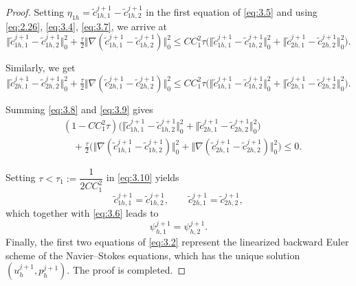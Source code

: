 \documentclass[a4paper,fleqn]{cas-sc}
\numberwithin{equation}{section}
\theoremstyle{definition}
\begin{document}
\begin{proof}
Setting $\eta_{1h}=\tilde{c}^{j+1}_{1h,1}-\tilde{c}^{j+1}_{1h,2}$ in the
first equation of \eqref{eq:3.5} and using
\eqref{eq:2.26}, \eqref{eq:3.4}, \eqref{eq:3.7}, we arrive at
\begin{equation}
  \bigl\Vert\tilde{c}^{j+1}_{1h,1}-\tilde{c}^{j+1}_{1h,2}\bigr\Vert_{0}^{2}
  + \tfrac{\tau}{2}\bigl\Vert\nabla(\tilde{c}^{j+1}_{1h,1}-\tilde{c}^{j+1}_{1h,2})\bigr\Vert_{0}^{2}
  \le CC_{1}^{2}\tau\bigl(\bigl\Vert\tilde{c}^{j+1}_{1h,1}-\tilde{c}^{j+1}_{1h,2}\bigr\Vert_{0}^{2}
      + \bigl\Vert\tilde{c}^{j+1}_{2h,1}-\tilde{c}^{j+1}_{2h,2}\bigr\Vert_{0}^{2}\bigr).
  \label{eq:3.8}
\end{equation}

Similarly, we get
\begin{equation}
  \bigl\Vert\tilde{c}^{j+1}_{2h,1}-\tilde{c}^{j+1}_{2h,2}\bigr\Vert_{0}^{2}
  + \tfrac{\tau}{2}\bigl\Vert\nabla(\tilde{c}^{j+1}_{2h,1}-\tilde{c}^{j+1}_{2h,2})\bigr\Vert_{0}^{2}
  \le CC_{1}^{2}\tau\bigl(\bigl\Vert\tilde{c}^{j+1}_{1h,1}-\tilde{c}^{j+1}_{1h,2}\bigr\Vert_{0}^{2}
      + \bigl\Vert\tilde{c}^{j+1}_{2h,1}-\tilde{c}^{j+1}_{2h,2}\bigr\Vert_{0}^{2}\bigr).
  \label{eq:3.9}
\end{equation}

Summing \eqref{eq:3.8} and \eqref{eq:3.9} gives
\begin{equation}
  \begin{aligned}
    &(1-CC_{1}^{2}\tau)
     \bigl(\bigl\Vert\tilde{c}^{j+1}_{1h,1}-\tilde{c}^{j+1}_{1h,2}\bigr\Vert_{0}^{2}
           + \bigl\Vert\tilde{c}^{j+1}_{2h,1}-\tilde{c}^{j+1}_{2h,2}\bigr\Vert_{0}^{2}\bigr)\\
    &\quad
     + \tfrac{\tau}{2}\bigl(\bigl\Vert\nabla(\tilde{c}^{j+1}_{1h,1}-\tilde{c}^{j+1}_{1h,2})\bigr\Vert_{0}^{2}
           + \bigl\Vert\nabla(\tilde{c}^{j+1}_{2h,1}-\tilde{c}^{j+1}_{2h,2})\bigr\Vert_{0}^{2}\bigr)
     \le 0.
  \end{aligned}
  \label{eq:3.10}
\end{equation}

Setting $\tau<\tau_{1}:=\dfrac{1}{2CC_{1}^{2}}$ in \eqref{eq:3.10} yields
\begin{equation}
  \tilde{c}^{j+1}_{1h,1} = \tilde{c}^{j+1}_{1h,2},
  \qquad
  \tilde{c}^{j+1}_{2h,1} = \tilde{c}^{j+1}_{2h,2},
  \label{eq:3.11}
\end{equation}
which together with \eqref{eq:3.6} leads to
\begin{equation}
  \psi^{j+1}_{h,1} = \psi^{j+1}_{h,2}.
  \label{eq:3.12}
\end{equation}
Finally, the first two equations of \eqref{eq:3.2} represent the
linearized backward Euler scheme of the Navier--Stokes equations, which has
the unique solution $(u^{j+1}_{h},p^{j+1}_{h})$. The proof is completed.
\end{proof}
\end{document}
